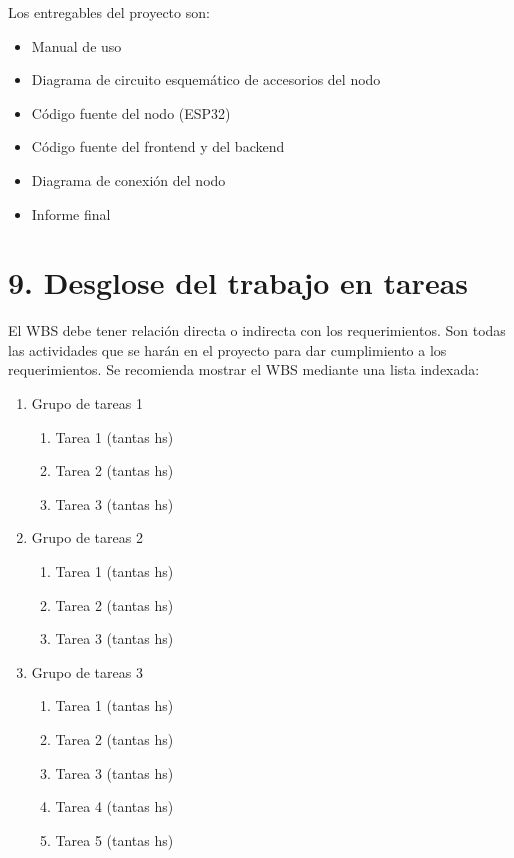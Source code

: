 \documentclass[
11pt, %
]{charter}
\begin{document}
Los entregables del proyecto son:

\begin{itemize}
	\item Manual de uso
	\item Diagrama de circuito esquemático de accesorios del nodo
	\item Código fuente del nodo (ESP32)
	\item Código fuente del frontend y del backend
	\item Diagrama de conexión del nodo
	\item Informe final
\end{itemize}

\section{9. Desglose del trabajo en tareas}
\label{sec:wbs}

El WBS debe tener relación directa o indirecta con los requerimientos.  Son todas las actividades que se harán en el proyecto para dar cumplimiento a los requerimientos. Se recomienda mostrar el WBS mediante una lista indexada:

\begin{enumerate}
\item Grupo de tareas 1
	\begin{enumerate}
	\item Tarea 1 (tantas hs)
	\item Tarea 2 (tantas hs)
	\item Tarea 3 (tantas hs)
	\end{enumerate}
\item Grupo de tareas 2
	\begin{enumerate}
	\item Tarea 1 (tantas hs)
	\item Tarea 2 (tantas hs)
	\item Tarea 3 (tantas hs)
	\end{enumerate}
\item Grupo de tareas 3
	\begin{enumerate}
	\item Tarea 1 (tantas hs)
	\item Tarea 2 (tantas hs)
	\item Tarea 3 (tantas hs)
	\item Tarea 4 (tantas hs)
	\item Tarea 5 (tantas hs)
	\end{enumerate}
\end{enumerate}
\end{document}
